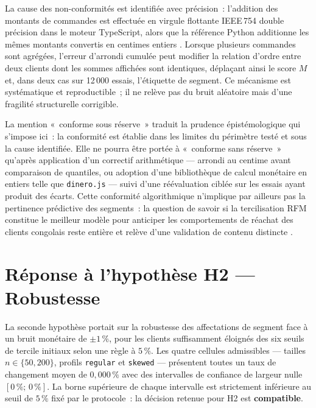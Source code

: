 La cause des non-conformités est identifiée avec précision~: l'addition des montants de
commandes est effectuée en virgule flottante IEEE\,754 double précision dans le moteur
TypeScript, alors que la référence Python additionne les mêmes montants convertis en centimes
entiers \citep{Haissinsky2012, Ribatet_nd}. Lorsque plusieurs commandes sont agrégées,
l'erreur d'arrondi cumulée peut modifier la relation d'ordre entre deux clients dont les
sommes affichées sont identiques, déplaçant ainsi le score $M$ et, dans deux cas sur 12\,000
essais, l'étiquette de segment. Ce mécanisme est systématique et reproductible~; il ne
relève pas du bruit aléatoire mais d'une fragilité structurelle corrigible.

La mention «~conforme sous réserve~» traduit la prudence épistémologique qui s'impose ici~:
la conformité est établie dans les limites du périmètre testé et sous la cause identifiée.
Elle ne pourra être portée à «~conforme sans réserve~» qu'après application d'un correctif
arithmétique — arrondi au centime avant comparaison de quantiles, ou adoption d'une
bibliothèque de calcul monétaire en entiers telle que \texttt{dinero.js} — suivi d'une
réévaluation ciblée sur les essais ayant produit des écarts. Cette conformité algorithmique
n'implique par ailleurs pas la pertinence prédictive des segments~: la question de savoir
si la tercilisation RFM constitue le meilleur modèle pour anticiper les comportements de
réachat des clients congolais \citep{Fader2005} reste entière et relève d'une validation
de contenu distincte \citep{Salminen2023}.

\section*{Réponse à l'hypothèse H2 — Robustesse}

La seconde hypothèse portait sur la robustesse des affectations de segment face à un bruit
monétaire de $\pm1\,\%$, pour les clients suffisamment éloignés des six seuils de tercile
initiaux selon une règle à $5\,\%$. Les quatre cellules admissibles — tailles
$n \in \{50, 200\}$, profils \texttt{regular} et \texttt{skewed} — présentent toutes un
taux de changement moyen de $0{,}000\,\%$ avec des intervalles de confiance de largeur
nulle $[0\,\% ;\, 0\,\%]$. La borne supérieure de chaque intervalle est strictement
inférieure au seuil de $5\,\%$ fixé par le protocole~: la décision retenue pour H2 est
\textbf{compatible}.


